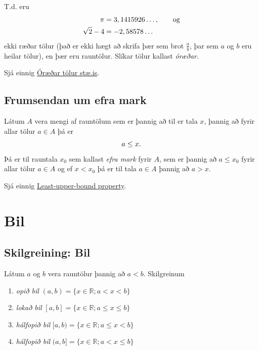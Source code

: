 \documentclass[a4paper,10pt,icelandic]{sphinxmanual}
\begin{document}
T.d. eru
\begin{gather}
\begin{split}\begin{aligned}
\pi &= 3,1415926\ldots, \qquad \text{og}\\
\sqrt 2 -4  &= -2,58578\ldots\end{aligned}\end{split}\notag
\end{gather}
ekki ræðar tölur (það er ekki hægt að skrifa þær sem brot
\(\frac ab\), þar sem \(a\) og \(b\) eru heilar tölur), en
þær eru rauntölur. Slíkar tölur kallast \textit{óræðar}.

Sjá einnig \href{http://www.xn--st-2ia.is/fletta/\%C3\%B3r\%C3\%A6\%C3\%B0ar\_t\%C3\%B6lur}{Óræðar tölur \textbar{} stæ.is}.


\subsection{Frumsendan um efra mark}
\label{kafli01:frumsendan-um-efra-mark}\label{kafli01:frumsendanumeframark}\label{kafli01:index-1}
Látum \(A\) vera mengi af rauntölum sem
er þannig að til er tala \(x\), þannig að fyrir allar tölur
\(a \in A\) þá er
\begin{gather}
\begin{split}a\leq x.\end{split}\notag
\end{gather}
Þá er til rauntala \(x_0\) sem kallast \textit{efra mark} fyrir
\(A\), sem er þannig að \(a\leq x_0\) fyrir allar tölur
\(a\in
A\) og ef \(x<x_0\) þá er til tala \(a\in A\) þannig að
\(a>x\).

Sjá einnig \href{https://en.wikipedia.org/wiki/Least-upper-bound\_property}{Least-upper-bound property}.


\section{Bil}
\label{kafli01:bil}\label{kafli01:skilgreining-1-3-1}

\subsection{Skilgreining: Bil}
\label{kafli01:index-2}\label{kafli01:skilgreining-bil}
Látum \(a\) og \(b\) vera rauntölur þannig að
\(a<b\). Skilgreinum
\begin{enumerate}
\item {} 
\emph{opið bil} \((a,b)=\{x\in \mathbb{R}; a<x<b\}\)

\item {} 
\emph{lokað bil} \([a,b]=\{x\in \mathbb{R}; a\leq x\leq b\}\)

\item {} 
\emph{hálfopið bil} \([a,b)=\{x\in \mathbb{R}; a\leq x<b\}\)

\item {} 
\emph{hálfopið bil} \((a,b]=\{x\in \mathbb{R}; a< x\leq b\}\)

\end{enumerate}
\end{document}
